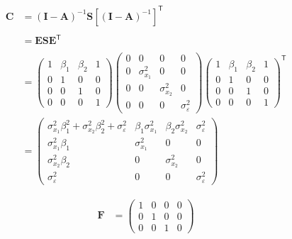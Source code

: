 \documentclass[
]{book}
\theoremstyle{definition}
\theoremstyle{definition}
\theoremstyle{definition}
\theoremstyle{remark}
\begin{document}
\begin{align*}\mathbf{C} &=\left( \mathbf{I} - \mathbf{A} \right)^{-1} \mathbf{S} \left[ \left( \mathbf{I} - \mathbf{A} \right)^{-1} \right]^{\mathsf{T}} \\\\ &=\mathbf{E} \mathbf{S} \mathbf{E}^{\mathsf{T}} \\\\ &=\left( \begin{array}{cccc} 1 & \beta  _{1} & \beta  _{2} & 1 \\ 0 & 1 & 0 & 0 \\ 0 & 0 & 1 & 0 \\ 0 & 0 & 0 & 1 \end{array} \right)\left( \begin{array}{cccc} 0 & 0 & 0 & 0 \\ 0 & \sigma  _{x _{1}} ^{2} & 0 & 0 \\ 0 & 0 & \sigma  _{x _{2}} ^{2} & 0 \\ 0 & 0 & 0 & \sigma  _{\varepsilon } ^{2} \end{array} \right)\left( \begin{array}{cccc} 1 & \beta  _{1} & \beta  _{2} & 1 \\ 0 & 1 & 0 & 0 \\ 0 & 0 & 1 & 0 \\ 0 & 0 & 0 & 1 \end{array} \right)^{\mathsf{T}}\\ &=\left( \begin{array}{cccc} \sigma  _{x _{1}} ^{2} \beta  _{1} ^{2} + \sigma  _{x _{2}} ^{2} \beta  _{2} ^{2} + \sigma  _{\varepsilon } ^{2} & \beta  _{1} \sigma  _{x _{1}} ^{2} & \beta  _{2} \sigma  _{x _{2}} ^{2} & \sigma  _{\varepsilon } ^{2} \\ \sigma  _{x _{1}} ^{2} \beta  _{1} & \sigma  _{x _{1}} ^{2} & 0 & 0 \\ \sigma  _{x _{2}} ^{2} \beta  _{2} & 0 & \sigma  _{x _{2}} ^{2} & 0 \\ \sigma  _{\varepsilon } ^{2} & 0 & 0 & \sigma  _{\varepsilon } ^{2} \end{array} \right)\end{align*}

\begin{align*}\mathbf{F} &=\left( \begin{array}{cccc} 1 & 0 & 0 & 0 \\ 0 & 1 & 0 & 0 \\ 0 & 0 & 1 & 0 \end{array} \right)\end{align*}
\end{document}
